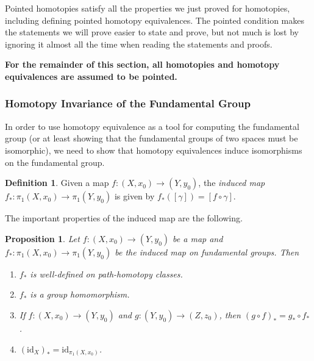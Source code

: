 \documentclass{article}
\newtheorem{prop}[thm]{Proposition}
\theoremstyle{definition}
\newtheorem{defi}[thm]{Definition}
\theoremstyle{remark}
\numberwithin{figure}{section}
\begin{document}
Pointed homotopies satisfy all the properties we just proved for homotopies, including defining pointed homotopy equivalences. The pointed condition makes the statements we will prove easier to state and prove, but not much is lost by ignoring it almost all the time when reading the statements and proofs.

\medskip
\noindent\textbf{For the remainder of this section, all homotopies and homotopy equivalences are assumed to be pointed.}

\subsubsection{Homotopy Invariance of the Fundamental Group}
In order to use homotopy equivalence as a tool for computing the fundamental group (or at least showing that the fundamental groups of two spaces must be isomorphic), we need to show that homotopy equivalences induce isomorphisms on the fundamental group.

\begin{defi}
	Given a map $f : (X, x_0) \to (Y, y_0)$, the \emph{induced map} $f_* : \pi_1(X, x_0) \to \pi_1(Y, y_0)$ is given by $f_*([\gamma]) = [f \circ \gamma]$.
\end{defi}

The important properties of the induced map are the following.

\begin{prop}
	Let $f : (X, x_0) \to (Y, y_0)$ be a map and $f_* : \pi_1(X, x_0) \to \pi_1(Y, y_0)$ be the induced map on fundamental groups. Then
	\begin{enumerate}
		\item $f_*$ is well-defined on path-homotopy classes.
		\item $f_*$ is a group homomorphism.
		\item If $f : (X, x_0) \to (Y, y_0)$ and $g : (Y, y_0) \to (Z, z_0)$, then $(g \circ f)_* = g_* \circ f_*$.
		\item $(\mathrm{id}_X)_* = \mathrm{id}_{\pi_1(X, x_0)}$.
	\end{enumerate}
\end{prop}
\end{document}
